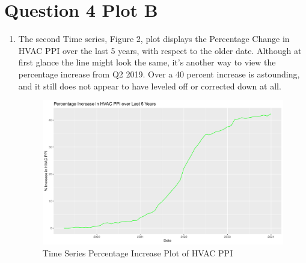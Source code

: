 \documentclass{article}
\begin{document}
\section{Question 4 Plot B}
\begin{enumerate}
\item The second Time series, Figure 2, plot displays the Percentage Change in HVAC PPI over the last 5 years, with respect to the older date. Although at first glance the line might look the same, it's another way to view the percentage increase from Q2 2019. Over a 40 percent increase is astounding, and it still does not appear to have leveled off or corrected down at all.
    \begin{figure}
        \centering
        \includegraphics[width=1\linewidth]{PS6b_Smith.png}
        \caption{Time Series Percentage Increase Plot of HVAC PPI}
        \label{fig:enter-label}
    \end{figure}
\end{enumerate}
\end{document}
